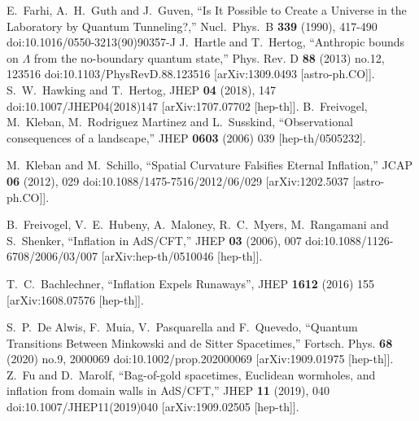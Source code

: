 \documentclass[a4paper,11pt]{article}
\numberwithin{equation}{section}
\begin{document}
\begin{thebibliography}{99}
E.~Farhi, A.~H.~Guth and J.~Guven,
``Is It Possible to Create a Universe in the Laboratory by Quantum Tunneling?,''
Nucl.\ Phys.\ B \textbf{339} (1990), 417-490
doi:10.1016/0550-3213(90)90357-J
J.~Hartle and T.~Hertog,
``Anthropic bounds on \ensuremath{\Lambda} from the no-boundary quantum state,''
Phys. Rev. D \textbf{88} (2013) no.12, 123516
doi:10.1103/PhysRevD.88.123516
[arXiv:1309.0493 [astro-ph.CO]].
S.~W.~Hawking and T.~Hertog,
JHEP \textbf{04} (2018), 147
doi:10.1007/JHEP04(2018)147
[arXiv:1707.07702 [hep-th]].
  B.~Freivogel, M.~Kleban, M.~Rodriguez Martinez and L.~Susskind,
  ``Observational consequences of a landscape,''
  JHEP {\bf 0603} (2006) 039
  [hep-th/0505232].
  
M.~Kleban and M.~Schillo,
``Spatial Curvature Falsifies Eternal Inflation,''
JCAP \textbf{06} (2012), 029
doi:10.1088/1475-7516/2012/06/029
[arXiv:1202.5037 [astro-ph.CO]].

B.~Freivogel, V.~E.~Hubeny, A.~Maloney, R.~C.~Myers, M.~Rangamani and S.~Shenker,
``Inflation in AdS/CFT,''
JHEP \textbf{03} (2006), 007
doi:10.1088/1126-6708/2006/03/007
[arXiv:hep-th/0510046 [hep-th]].
  
T.~C.~Bachlechner,
``Inflation Expels Runaways'',
JHEP {\bf 1612} (2016) 155
[arXiv:1608.07576 [hep-th]].

S.~P.~De Alwis, F.~Muia, V.~Pasquarella and F.~Quevedo,
``Quantum Transitions Between Minkowski and de Sitter Spacetimes,''
Fortsch. Phys. \textbf{68} (2020) no.9, 2000069
doi:10.1002/prop.202000069
[arXiv:1909.01975 [hep-th]].
Z.~Fu and D.~Marolf,
``Bag-of-gold spacetimes, Euclidean wormholes, and inflation from domain walls in AdS/CFT,''
JHEP \textbf{11} (2019), 040
doi:10.1007/JHEP11(2019)040
[arXiv:1909.02505 [hep-th]].


\end{thebibliography}
\end{document}
